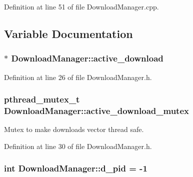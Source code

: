 Definition at line 51 of file DownloadManager.cpp.



\subsection{Variable Documentation}
\hypertarget{namespaceDownloadManager_a494f4d96351586b19499df59dda4e304}{
\subsubsection[{active\_\-download}]{$\ast$ {\bf DownloadManager::active\_\-download}}}
\label{namespaceDownloadManager_a494f4d96351586b19499df59dda4e304}


Definition at line 26 of file DownloadManager.h.

\hypertarget{namespaceDownloadManager_a515aa52eb5e3ee12d7db95cb84a3f8ce}{
\subsubsection[{active\_\-download\_\-mutex}]{\setlength{\rightskip}{0pt plus 5cm}pthread\_\-mutex\_\-t {\bf DownloadManager::active\_\-download\_\-mutex}}}
\label{namespaceDownloadManager_a515aa52eb5e3ee12d7db95cb84a3f8ce}


Mutex to make downloads vector thread safe. 



Definition at line 30 of file DownloadManager.h.

\hypertarget{namespaceDownloadManager_a6aaa0efb9476dcf004cbb6192f8236a1}{
\subsubsection[{d\_\-pid}]{\setlength{\rightskip}{0pt plus 5cm}int {\bf DownloadManager::d\_\-pid} = -\/1}}
\label{namespaceDownloadManager_a6aaa0efb9476dcf004cbb6192f8236a1}


